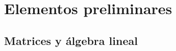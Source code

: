 
\chapter{Elementos preliminares}


\newpage

\newpage

\newpage

\newpage

\newpage 





\newpage
\section{Matrices y álgebra lineal}

